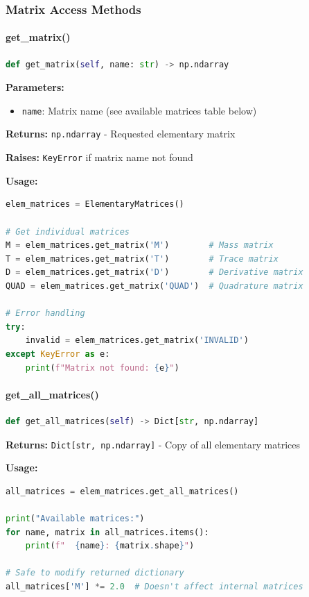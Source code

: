 \subsubsection{Matrix Access Methods}

\paragraph{get\_matrix()}\leavevmode
\begin{lstlisting}[language=Python, caption=Get Matrix Method]
def get_matrix(self, name: str) -> np.ndarray
\end{lstlisting}

\textbf{Parameters:}
\begin{itemize}
    \item \texttt{name}: Matrix name (see available matrices table below)
\end{itemize}

\textbf{Returns:} \texttt{np.ndarray} - Requested elementary matrix

\textbf{Raises:} \texttt{KeyError} if matrix name not found

\textbf{Usage:}
\begin{lstlisting}[language=Python, caption=Get Matrix Usage]
elem_matrices = ElementaryMatrices()

# Get individual matrices
M = elem_matrices.get_matrix('M')        # Mass matrix
T = elem_matrices.get_matrix('T')        # Trace matrix  
D = elem_matrices.get_matrix('D')        # Derivative matrix
QUAD = elem_matrices.get_matrix('QUAD')  # Quadrature matrix

# Error handling
try:
    invalid = elem_matrices.get_matrix('INVALID')
except KeyError as e:
    print(f"Matrix not found: {e}")
\end{lstlisting}

\paragraph{get\_all\_matrices()}\leavevmode
\begin{lstlisting}[language=Python, caption=Get All Matrices Method]
def get_all_matrices(self) -> Dict[str, np.ndarray]
\end{lstlisting}

\textbf{Returns:} \texttt{Dict[str, np.ndarray]} - Copy of all elementary matrices

\textbf{Usage:}
\begin{lstlisting}[language=Python, caption=Get All Matrices Usage]
all_matrices = elem_matrices.get_all_matrices()

print("Available matrices:")
for name, matrix in all_matrices.items():
    print(f"  {name}: {matrix.shape}")

# Safe to modify returned dictionary
all_matrices['M'] *= 2.0  # Doesn't affect internal matrices
\end{lstlisting}

